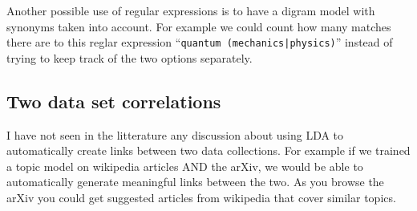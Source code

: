 \documentclass[11pt]{article}
\begin{document}
        Another possible use of regular expressions is to have a digram model with synonyms
        taken into account. For example we could count how many matches there are to this
        reglar expression ``\texttt{quantum (mechanics|physics)}'' instead of trying to keep
        track of the two options separately.
		

		


    \subsection{Two data set correlations}

        I have not seen in the litterature any discussion about using LDA to automatically
        create links between two data collections.
        For example if we trained a topic model on wikipedia articles AND the arXiv,
        we would be able to automatically generate meaningful links between the two.
        As you browse the arXiv you could get suggested articles from wikipedia that cover similar topics.
\end{document}
